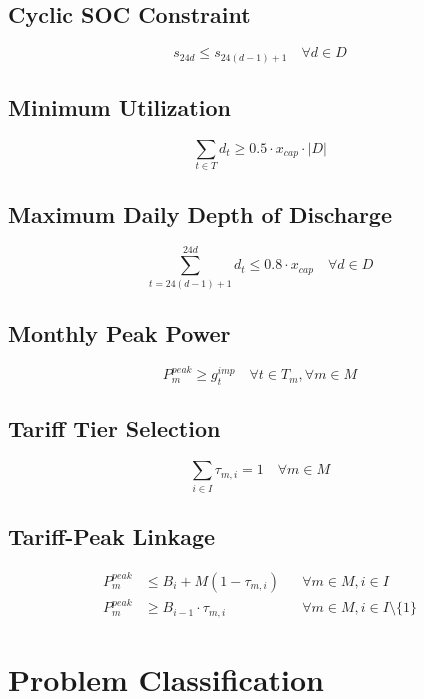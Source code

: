 \documentclass{article}
\begin{document}
\subsection{Cyclic SOC Constraint}
\begin{equation}
s_{24d} \leq s_{24(d-1)+1} \quad \forall d \in D
\end{equation}

\subsection{Minimum Utilization}
\begin{equation}
\sum_{t \in T} d_t \geq 0.5 \cdot x_{cap} \cdot |D|
\end{equation}

\subsection{Maximum Daily Depth of Discharge}
\begin{equation}
\sum_{t=24(d-1)+1}^{24d} d_t \leq 0.8 \cdot x_{cap} \quad \forall d \in D
\end{equation}

\subsection{Monthly Peak Power}
\begin{equation}
P^{peak}_m \geq g^{imp}_t \quad \forall t \in T_m, \forall m \in M
\end{equation}

\subsection{Tariff Tier Selection}
\begin{equation}
\sum_{i \in I} \tau_{m,i} = 1 \quad \forall m \in M
\end{equation}

\subsection{Tariff-Peak Linkage}
\begin{align}
P^{peak}_m &\leq B_i + M(1 - \tau_{m,i}) && \forall m \in M, i \in I\\
P^{peak}_m &\geq B_{i-1} \cdot \tau_{m,i} && \forall m \in M, i \in I \setminus \{1\}
\end{align}

\section{Problem Classification}
\end{document}

